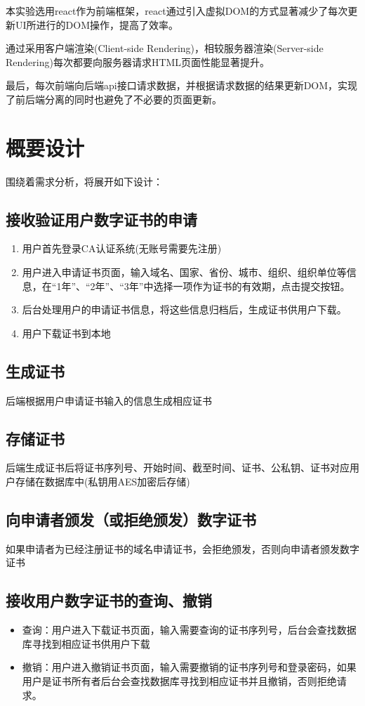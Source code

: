 \documentclass{ctexart}
\begin{document}
本实验选用react作为前端框架，react通过引入虚拟DOM的方式显著减少了每次更新UI所进行的DOM操作，提高了效率。

通过采用客户端渲染(Client-side Rendering)，相较服务器渲染(Server-side Rendering)每次都要向服务器请求HTML页面性能显著提升。

最后，每次前端向后端api接口请求数据，并根据请求数据的结果更新DOM，实现了前后端分离的同时也避免了不必要的页面更新。
\section{概要设计}
围绕着需求分析，将展开如下设计：
\subsection{接收验证用户数字证书的申请}
\begin{enumerate}
    \item 用户首先登录CA认证系统(无账号需要先注册)
    \item 用户进入申请证书页面，输入域名、国家、省份、城市、组织、组织单位等信息，在“1年”、“2年”、“3年”中选择一项作为证书的有效期，点击提交按钮。
    \item 后台处理用户的申请证书信息，将这些信息归档后，生成证书供用户下载。
    \item 用户下载证书到本地
\end{enumerate}
\subsection{生成证书}
后端根据用户申请证书输入的信息生成相应证书
\subsection{存储证书}
后端生成证书后将证书序列号、开始时间、截至时间、证书、公私钥、证书对应用户存储在数据库中(私钥用AES加密后存储)
\subsection{向申请者颁发（或拒绝颁发）数字证书}
如果申请者为已经注册证书的域名申请证书，会拒绝颁发，否则向申请者颁发数字证书
\subsection{接收用户数字证书的查询、撤销}
\begin{itemize}
    \item 查询：用户进入下载证书页面，输入需要查询的证书序列号，后台会查找数据库寻找到相应证书供用户下载
    \item 撤销：用户进入撤销证书页面，输入需要撤销的证书序列号和登录密码，如果用户是证书所有者后台会查找数据库寻找到相应证书并且撤销，否则拒绝请求。
\end{itemize}
\end{document}
